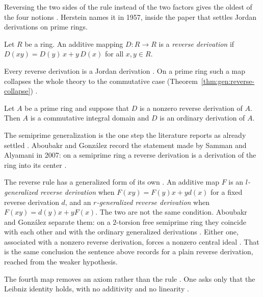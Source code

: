 Reversing the two sides of the rule instead of the two factors gives the
oldest of the four notions \cite[p.~1105]{Herstein1957}. Herstein names it
in 1957, inside the paper that settles Jordan derivations on prime rings.

\begin{definition}\label{def:gen:reverse-derivation}
Let $R$ be a ring. An additive mapping $D\colon R\to R$ is a \emph{reverse
derivation} if $D(xy)=D(y)\,x+y\,D(x)$ for all $x,y\in R$.
\end{definition}

Every reverse derivation is a Jordan derivation \cite[p.~1105]{Herstein1957}.
On a prime ring such a map collapses the whole theory to the commutative case
(Theorem~\ref{thm:gen:reverse-collapse}) \cite[p.~1106]{Herstein1957}.

\begin{theorem}\label{thm:gen:reverse-collapse}
Let $A$ be a prime ring and suppose that $D$ is a nonzero reverse derivation
of $A$. Then $A$ is a commutative integral domain and $D$ is an ordinary
derivation of $A$.
\end{theorem}

The semiprime generalization is the one step the literature reports as already
settled \cite[p.~200]{AboubakrGonzalez2015}. Aboubakr and Gonz\'{a}lez record
the statement made by Samman and Alyamani in 2007: on a semiprime ring a
reverse derivation is a derivation of the ring into its center
\cite[p.~200]{AboubakrGonzalez2015}.

The reverse rule has a generalized form of its own
\cite[p.~199]{AboubakrGonzalez2015}. An additive map $F$ is an
\emph{$l$-generalized reverse derivation} \cite[p.~199]{AboubakrGonzalez2015}
when $F(xy)=F(y)x+yd(x)$ for a fixed reverse derivation $d$, and an
\emph{$r$-generalized reverse derivation} \cite[p.~199]{AboubakrGonzalez2015}
when $F(xy)=d(y)x+yF(x)$. The two are not the same condition. Aboubakr and
Gonz\'{a}lez separate them: on a $2$-torsion free semiprime ring they coincide
with each other and with the ordinary generalized derivations
\cite[pp.~204--205]{AboubakrGonzalez2015}. Either one, associated with a
nonzero reverse derivation, forces a nonzero central ideal
\cite[Corollary~3.3]{AboubakrGonzalez2015}. That is the same conclusion the
sentence above records for a plain reverse derivation, reached from the weaker
hypothesis.

The fourth map removes an axiom rather than the rule
\cite[p.~190]{GoldmannSemrl1996}. One asks only that the Leibniz identity
holds, with no additivity and no linearity \cite[p.~190]{GoldmannSemrl1996}.

